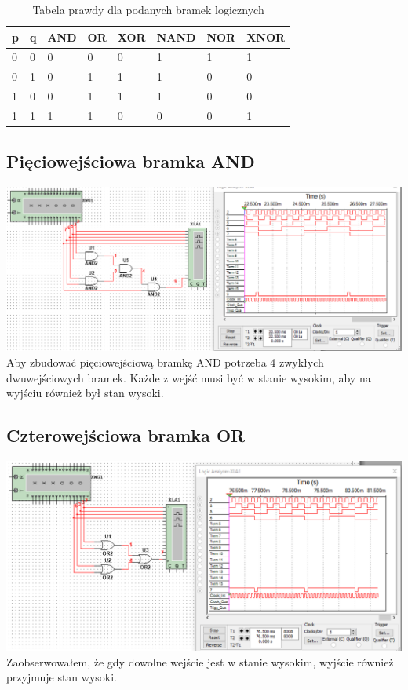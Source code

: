 \documentclass[12pt,a4paper]{article}
\begin{document}
\begin{table}[H]
\begin{center}

\label{logiczne}
\begin{tabular}{|p{1.1cm}|p{1.1cm}|p{1.1cm}|p{1.1cm}|p{1.1cm}|p{1.1cm}|p{1.1cm}|p{1.1cm}|}
\hline
p & q & AND & OR & XOR & NAND & NOR & XNOR \\ \hline
0 & 0 & 0 & 0 & 0 & 1 & 1 & 1 \\ \hline
0 & 1 & 0 & 1 & 1 & 1 & 0 & 0 \\ \hline
1 & 0 & 0 & 1 & 1 & 1 & 0 & 0 \\ \hline
1 & 1 & 1 & 1 & 0 & 0 & 0 & 1 \\ \hline
\end{tabular}
\caption{Tabela prawdy dla podanych bramek logicznych}
\end{center}
\end{table}

\subsection{Pięciowejściowa bramka AND}
\includegraphics[width=\textwidth]{logic_analyzer/five_way_and}
Aby zbudować pięciowejściową bramkę AND potrzeba 4 zwykłych dwuwejściowych bramek. Każde z wejść musi być w stanie wysokim, aby na wyjściu również był stan wysoki.

\subsection{Czterowejściowa bramka OR}
\includegraphics[width=\textwidth]{logic_analyzer/four_way_or}
Zaobserwowałem, że gdy dowolne wejście jest w stanie wysokim, wyjście również przyjmuje stan wysoki. 
\end{document}
